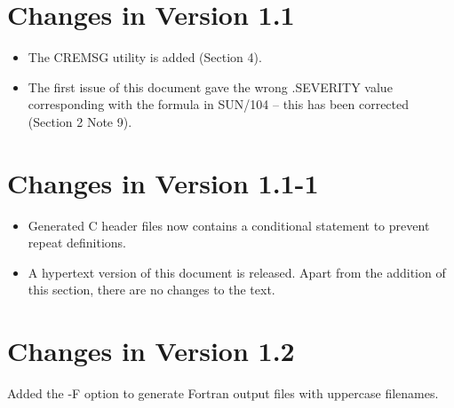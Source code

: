 \section{Changes in Version 1.1}
\begin{itemize}
\item The CREMSG utility is added (Section 4).
\item The first issue of this document gave the wrong .SEVERITY value 
corresponding with the formula in SUN/104 -- this has been corrected
(Section 2 Note 9).
\end{itemize}

\section{Changes in Version 1.1-1}
\begin{itemize}
\item Generated C header files now contains a conditional statement to prevent 
repeat definitions.
\item A hypertext version of this document is released. Apart from the 
addition of this section, there are no changes to the text.
\end{itemize}

\section{Changes in Version 1.2}
Added the -F option to generate Fortran output files with uppercase filenames.

